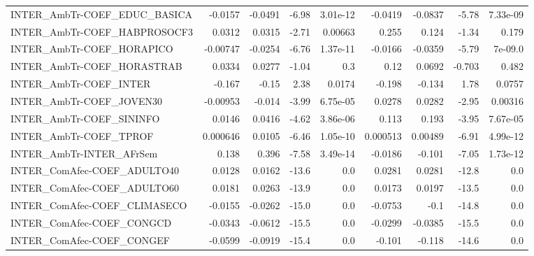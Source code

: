 \begin{tabular}{lrrrrrrrr}
INTER\_AmbTr-COEF\_EDUC\_BASICA           &     -0.0157 &      -0.0491 &    -6.98 & 3.01e-12 &    -0.0419 &     -0.0837 &        -5.78 &      7.33e-09 \\
INTER\_AmbTr-COEF\_HABPROSOCF3           &      0.0312 &       0.0315 &    -2.71 &  0.00663 &      0.255 &       0.124 &        -1.34 &         0.179 \\
INTER\_AmbTr-COEF\_HORAPICO              &    -0.00747 &      -0.0254 &    -6.76 & 1.37e-11 &    -0.0166 &     -0.0359 &        -5.79 &       7e-09.0 \\
INTER\_AmbTr-COEF\_HORASTRAB             &      0.0334 &       0.0277 &    -1.04 &      0.3 &       0.12 &      0.0692 &       -0.703 &         0.482 \\
INTER\_AmbTr-COEF\_INTER                 &      -0.167 &        -0.15 &     2.38 &   0.0174 &     -0.198 &      -0.134 &         1.78 &        0.0757 \\
INTER\_AmbTr-COEF\_JOVEN30               &    -0.00953 &       -0.014 &    -3.99 & 6.75e-05 &     0.0278 &      0.0282 &        -2.95 &       0.00316 \\
INTER\_AmbTr-COEF\_SININFO               &      0.0146 &       0.0416 &    -4.62 & 3.86e-06 &      0.113 &       0.193 &        -3.95 &      7.67e-05 \\
INTER\_AmbTr-COEF\_TPROF                 &    0.000646 &       0.0105 &    -6.46 & 1.05e-10 &   0.000513 &     0.00489 &        -6.91 &      4.99e-12 \\
INTER\_AmbTr-INTER\_AFrSem               &       0.138 &        0.396 &    -7.58 & 3.49e-14 &    -0.0186 &      -0.101 &        -7.05 &      1.73e-12 \\
INTER\_ComAfec-COEF\_ADULTO40            &      0.0128 &       0.0162 &    -13.6 &      0.0 &     0.0281 &      0.0281 &        -12.8 &           0.0 \\
INTER\_ComAfec-COEF\_ADULTO60            &      0.0181 &       0.0263 &    -13.9 &      0.0 &     0.0173 &      0.0197 &        -13.5 &           0.0 \\
INTER\_ComAfec-COEF\_CLIMASECO           &     -0.0155 &      -0.0262 &    -15.0 &      0.0 &    -0.0753 &        -0.1 &        -14.8 &           0.0 \\
INTER\_ComAfec-COEF\_CONGCD              &     -0.0343 &      -0.0612 &    -15.5 &      0.0 &    -0.0299 &     -0.0385 &        -15.5 &           0.0 \\
INTER\_ComAfec-COEF\_CONGEF              &     -0.0599 &      -0.0919 &    -15.4 &      0.0 &     -0.101 &      -0.118 &        -14.6 &           0.0 \\

\end{tabular}
